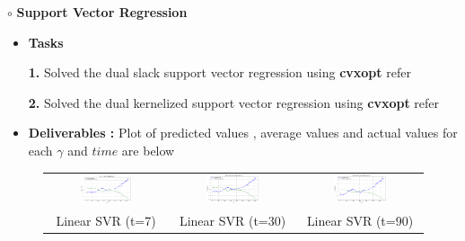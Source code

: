 \documentclass{article}
\begin{document}
\noindent $\circ$ \textbf{Support Vector Regression}
\begin{itemize}
    \item \textbf{Tasks}
    \vspace{5pt}

    \textbf{1.} Solved the dual slack support vector regression using \textbf{cvxopt} refer 

    \textbf{2.} Solved the dual kernelized support vector regression using \textbf{cvxopt} refer 

    \item \textbf{Deliverables :} Plot of predicted values , average values and actual  values for each $\gamma$ and $time$ are below
\end{itemize}
\newpage
\begin{figure}[h]
    \centering
    \renewcommand{\arraystretch}{2} %

    \setlength{\tabcolsep}{-25pt}
   \noindent \begin{tabular}{ccc} %
        \includegraphics[width=0.45\textwidth]{linear7.png} &  
        \includegraphics[width=0.45\textwidth]{linear30.png} &  
        \includegraphics[width=0.45\textwidth]{linear90.png} \\

        \small Linear SVR (t=7) & \small Linear SVR (t=30) & \small Linear SVR (t=90) \\


\end{tabular}
\end{figure}
\end{document}
